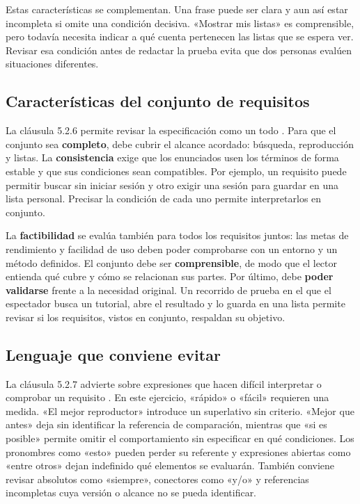 \documentclass[11pt,a4paper]{article}
\begin{document}
Estas características se complementan. Una frase puede ser clara y aun
así estar incompleta si omite una condición decisiva. «Mostrar mis listas»
es comprensible, pero todavía necesita indicar a qué cuenta pertenecen
las listas que se espera ver. Revisar esa condición antes de redactar la
prueba evita que dos personas evalúen situaciones diferentes.

\subsection{Características del conjunto de requisitos}
La cláusula 5.2.6 permite revisar la especificación como un todo
\cite[cl. 5.2.6]{ieee29148}. Para que el conjunto sea \textbf{completo},
debe cubrir el alcance acordado: búsqueda, reproducción y listas. La
\textbf{consistencia} exige que los enunciados usen los términos de forma
estable y que sus condiciones sean compatibles. Por ejemplo, un requisito
puede permitir buscar sin iniciar sesión y otro exigir una sesión para
guardar en una lista personal. Precisar la condición de cada uno permite
interpretarlos en conjunto.

La \textbf{factibilidad} se evalúa también para todos los requisitos
juntos: las metas de rendimiento y facilidad de uso deben poder
comprobarse con un entorno y un método definidos. El conjunto debe ser
\textbf{comprensible}, de modo que el lector entienda qué cubre y cómo se
relacionan sus partes. Por último, debe \textbf{poder validarse} frente a
la necesidad original. Un recorrido de prueba en el que el espectador
busca un tutorial, abre el resultado y lo guarda en una lista permite
revisar si los requisitos, vistos en conjunto, respaldan su objetivo.

\subsection{Lenguaje que conviene evitar}
La cláusula 5.2.7 advierte sobre expresiones que hacen difícil interpretar
o comprobar un requisito \cite[cl. 5.2.7]{ieee29148}. En este ejercicio,
«rápido» o «fácil» requieren una medida. «El mejor reproductor» introduce
un superlativo sin criterio. «Mejor que antes» deja sin identificar la
referencia de comparación, mientras que «si es posible» permite omitir
el comportamiento sin especificar en qué condiciones. Los pronombres
como «esto» pueden perder su referente y expresiones abiertas como
«entre otros» dejan indefinido qué elementos se evaluarán. También
conviene revisar absolutos como «siempre», conectores como «y/o» y
referencias incompletas cuya versión o alcance no se pueda identificar.
\end{document}
